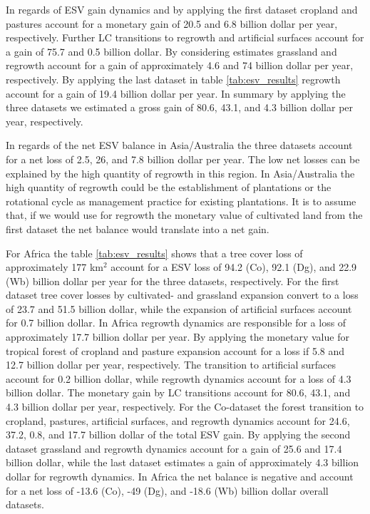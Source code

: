 		In regards of \ac{ESV} gain dynamics and by applying the first dataset cropland and pastures account for a monetary gain of 20.5 and 6.8 billion dollar per year, respectively. Further \ac{LC} transitions to regrowth and artificial surfaces account for a gain of 75.7 and 0.5 billion dollar. By considering \citet{Groot2012} estimates grassland and regrowth account for a gain of approximately 4.6 and 74 billion dollar per year, respectively. By applying the last dataset in table \ref{tab:esv_results} regrowth account for a gain of 19.4 billion dollar per year. In summary by applying the three datasets we estimated a gross gain of 80.6, 43.1, and 4.3 billion dollar per year, respectively.

		In regards of the net \ac{ESV} balance in Asia/Australia the three datasets account for a net loss of 2.5, 26, and 7.8 billion dollar per year. The low net losses can be explained by the high quantity of regrowth in this region. In Asia/Australia the high quantity of regrowth could be the establishment of plantations or the rotational cycle as management practice for existing plantations. It is to assume that, if we would use for regrowth the monetary value of cultivated land from the first dataset the net balance would translate into a net gain.

		For Africa the table \ref{tab:esv_results} shows that a tree cover loss of approximately 177 km$^2$ account for a \ac{ESV} loss of 94.2 (Co), 92.1 (Dg), and 22.9 (Wb) billion dollar per year for the three datasets, respectively. For the first dataset tree cover losses by cultivated- and grassland expansion convert to a loss of 23.7 and 51.5 billion dollar, while the expansion of artificial surfaces account for 0.7 billion dollar. In Africa regrowth dynamics are responsible for a loss of approximately 17.7 billion dollar per year. By applying the monetary value for tropical forest of \citet{Siikamaki2015} cropland and pasture expansion account for a loss if 5.8 and 12.7 billion dollar per year, respectively. The transition to artificial surfaces account for 0.2 billion dollar, while regrowth dynamics account for a loss of 4.3 billion dollar. The monetary gain by \ac{LC} transitions account for 80.6, 43.1, and 4.3 billion dollar per year, respectively. For the Co-dataset the forest transition to cropland, pastures, artificial surfaces, and regrowth dynamics account for 24.6, 37.2, 0.8, and 17.7 billion dollar of the total \ac{ESV} gain. By applying the second dataset grassland and regrowth dynamics account for a gain of 25.6 and 17.4 billion dollar, while the last dataset estimates a gain of approximately 4.3 billion dollar for regrowth dynamics. In Africa the net balance is negative and account for a net loss of -13.6 (Co), -49 (Dg), and -18.6 (Wb) billion dollar overall datasets.

